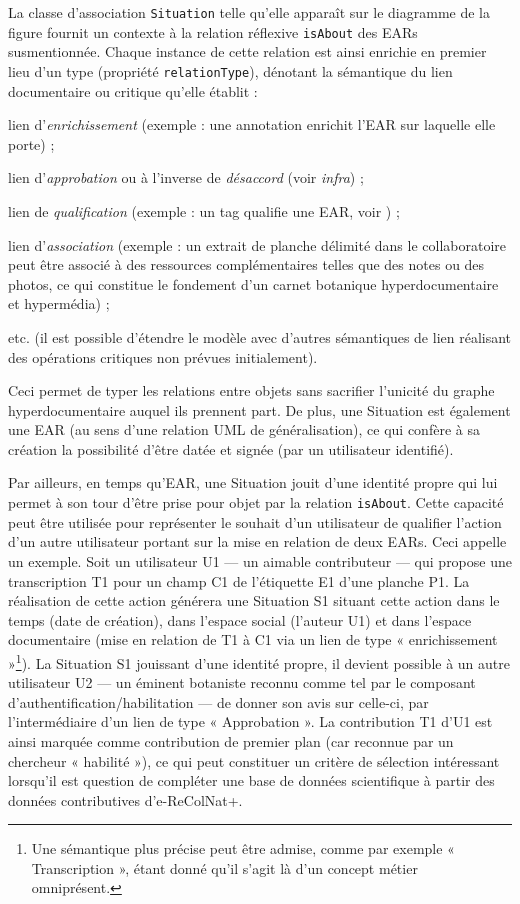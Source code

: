 La classe d'association {\tt Situation} telle qu'elle apparaît sur le diagramme de la figure  fournit un contexte à la relation réflexive {\tt isAbout} des EARs susmentionnée.
Chaque instance de cette relation est ainsi enrichie en premier lieu d'un type (propriété {\tt relationType}), dénotant la sémantique du lien documentaire ou critique qu'elle établit :

\startitemize
\item lien d'{\em enrichissement} (exemple : une annotation enrichit l'EAR sur laquelle elle porte) ;
\item lien d'{\em approbation} ou à l'inverse de {\em désaccord} (voir {\it infra}) ;
\item lien de {\em qualification} (exemple : un tag qualifie une EAR, voir ) ;
\item lien d'{\em association} (exemple : un extrait de planche délimité dans le collaboratoire peut être associé à des ressources complémentaires telles que des notes ou des photos, ce qui constitue le fondement d'un carnet botanique hyperdocumentaire et hypermédia) ;
\item etc. (il est possible d'étendre le modèle avec d'autres sémantiques de lien réalisant des opérations critiques non prévues initialement).
\stopitemize
 
Ceci permet de typer les relations entre objets sans sacrifier l'unicité du graphe hyperdocumentaire auquel ils prennent part.
De plus, une Situation est également une EAR (au sens d'une relation UML de généralisation), ce qui confère à sa création la possibilité d'être datée et signée (par un utilisateur identifié).

Par ailleurs, en temps qu'EAR, une Situation jouit d'une identité propre qui lui permet à son tour d'être prise pour objet par la relation {\tt isAbout}.
Cette capacité peut être utilisée pour représenter le souhait d'un utilisateur de qualifier l'action d'un autre utilisateur portant sur la mise en relation de deux EARs.
Ceci appelle un exemple.
Soit un utilisateur U1 --- un aimable contributeur --- qui propose une transcription T1 pour un champ C1 de l'étiquette E1 d'une planche P1.
La réalisation de cette action générera une Situation S1 situant cette action dans le temps (date de création), dans l'espace social (l'auteur U1) et dans l'espace documentaire (mise en relation de T1 à C1 via un lien de type « enrichissement »\footnote{Une sémantique plus précise peut être admise, comme par exemple « Transcription », étant donné qu'il s'agit là d'un concept métier omniprésent.}).
La Situation S1 jouissant d'une identité propre, il devient possible à un autre utilisateur U2 --- un éminent botaniste reconnu comme tel par le composant d'authentification/habilitation --- de donner son avis sur celle-ci, par l'intermédiaire d'un lien de type « Approbation ».
La contribution T1 d'U1 est ainsi marquée comme contribution de premier plan (car reconnue par un chercheur « habilité »), ce qui peut constituer un critère de sélection intéressant lorsqu'il est question de compléter une base de données scientifique à partir des données contributives d'e-ReColNat+.

